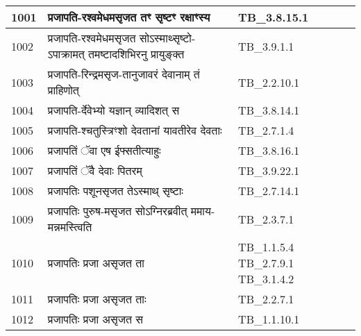 \documentclass[17pt]{extarticle}
\begin{document}
\begin{longtable}{||p{0.4in}||p{4.9in}||p{0.9in}||}
    \hline
        
    1001 & प्रजापति{-}रश्वमेधमसृजत तꣳ सृष्टꣳ रक्षाꣳस्य & TB\_3.8.15.1       \\
    
    \hline
        
    1002 & प्रजापति{-}रश्वमेधमसृजत सोऽस्माथ्सृष्टो{-}ऽपाक्रामत् तमष्टादशिभिरनु प्रायुङ्क्त & TB\_3.9.1.1       \\
    
    \hline
        
    1003 & प्रजापति{-}रिन्द्रमसृज{-}तानुजावरं देवानाम् तं प्राहिणोत् & TB\_2.2.10.1       \\
    
    \hline
        
    1004 & प्रजापति{-}र्देवेभ्यो यज्ञान् व्यादिशत् स & TB\_3.8.14.1       \\
    
    \hline
        
    1005 & प्रजापति{-}श्चतुस्त्रिꣳशो देवतानां यावतीरेव देवताः & TB\_2.7.1.4       \\
    
    \hline
        
    1006 & प्रजापतिं ॅवा एष ईफ्सतीत्याहुः & TB\_3.8.16.1       \\
    
    \hline
        
    1007 & प्रजापतिं ॅवै देवाः पितरम् & TB\_3.9.22.1       \\
    
    \hline
        
    1008 & प्रजापतिः पशूनसृजत तेऽस्माथ् सृष्टाः & TB\_2.7.14.1       \\
    
    \hline
        
    1009 & प्रजापतिः पुरुष{-}मसृजत सोऽग्निरब्रवीत् ममाय{-}मन्नमस्त्विति & TB\_2.3.7.1       \\
    
    \hline
        
    1010 & प्रजापतिः प्रजा असृजत ता & TB\_1.1.5.4 TB\_2.7.9.1 TB\_3.1.4.2       \\
    
    \hline
        
    1011 & प्रजापतिः प्रजा असृजत ताः & TB\_2.2.7.1       \\
    
    \hline
        
    1012 & प्रजापतिः प्रजा असृजत स & TB\_1.1.10.1       \\
    

\end{longtable}
\end{document}
